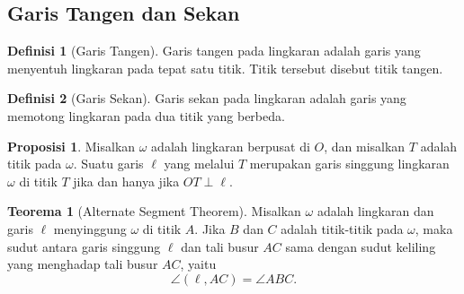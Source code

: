 \documentclass[aspectratio=169]{beamer}
\theoremstyle{definition}
\newtheorem{definisi}{Definisi}
\newtheorem{proposisi}{Proposisi}
\newtheorem{teorema}{Teorema}
\begin{document}
\subsection{Garis Tangen dan Sekan}
\begin{frame}{\insertsection}{\insertsubsection}
  \begin{definisi}[Garis Tangen]
    Garis tangen pada lingkaran adalah garis yang menyentuh lingkaran pada tepat satu titik. Titik tersebut disebut titik tangen.
  \end{definisi}

  \begin{definisi}[Garis Sekan]
    Garis sekan pada lingkaran adalah garis yang memotong lingkaran pada dua titik yang berbeda.
  \end{definisi}
  \begin{center}
  \end{center}
\end{frame}

\begin{frame}{\insertsection}{\insertsubsection}
  \begin{proposisi}
    Misalkan $\omega$ adalah lingkaran berpusat di $O$, dan misalkan $T$ adalah titik pada $\omega$. Suatu garis $\ell$ yang melalui $T$ merupakan garis singgung lingkaran $\omega$ di titik $T$ jika dan hanya jika
    $
      OT \perp \ell.
    $
  \end{proposisi}
  \begin{teorema}[Alternate Segment Theorem]
    Misalkan $\omega$ adalah lingkaran dan garis $\ell$ menyinggung $\omega$ di titik $A$. Jika $B$ dan $C$ adalah titik-titik pada $\omega$, maka sudut antara garis singgung $\ell$ dan tali busur $AC$ sama dengan sudut keliling yang menghadap tali busur $AC$, yaitu
    \[
      \angle(\ell,AC)=\angle ABC.
    \]
  \end{teorema}
\end{frame}
\end{document}
